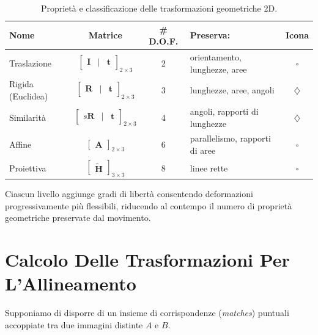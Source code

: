 ﻿\documentclass[11pt, a4paper]{article}
\begin{document}
\begin{table}[H]
\centering
\caption{Proprietà e classificazione delle trasformazioni geometriche 2D.}
\label{tab:trasformazioni}
\begin{tabularx}{\textwidth}{l c c l c}
\toprule
\textbf{Nome} & \textbf{Matrice} & \textbf{\# D.O.F.} & \textbf{Preserva:} & \textbf{Icona} \\
\midrule
Traslazione & $\begin{bmatrix} \bm{I} & \mid & \bm{t} \end{bmatrix}_{2 \times 3}$ & 2 & orientamento, lunghezze, aree & $\square$ \\
Rigida (Euclidea) & $\begin{bmatrix} \bm{R} & \mid & \bm{t} \end{bmatrix}_{2 \times 3}$ & 3 & lunghezze, aree, angoli & $\diamondsuit$ \\
Similarità & $\begin{bmatrix} s\bm{R} & \mid & \bm{t} \end{bmatrix}_{2 \times 3}$ & 4 & angoli, rapporti di lunghezze & $\diamondsuit$ \\
Affine & $\begin{bmatrix} \bm{A} \end{bmatrix}_{2 \times 3}$ & 6 & parallelismo, rapporti di aree & $\square$ \\
Proiettiva & $\begin{bmatrix} \tilde{\bm{H}} \end{bmatrix}_{3 \times 3}$ & 8 & linee rette & $\square$ \\
\bottomrule
\end{tabularx}
\end{table}

Ciascun livello aggiunge gradi di libertà consentendo deformazioni progressivamente più flessibili, riducendo al contempo il numero di proprietà geometriche preservate dal movimento.

\newpage

\section{Calcolo Delle Trasformazioni Per L'Allineamento}

Supponiamo di disporre di un insieme di corrispondenze (\emph{matches}) puntuali accoppiate tra due immagini distinte $A$ e $B$.

\end{document}
